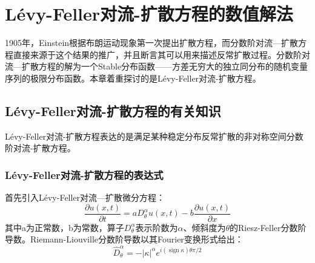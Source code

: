 
\chapter{Lévy-Feller对流-扩散方程的数值解法} \label{Chap:Surface_SCFT}

1905年，Einstein根据布朗运动现象第一次提出扩散方程，而分数阶对流—扩散方程直接来源于这个结果的推广，并且断言其可以用来描述反常扩散过程。分数阶对流—扩散方程的解为一个Stable分布函数——方差无穷大的独立同分布的随机变量序列的极限分布函数。本章着重探讨的是Lévy-Feller对流-扩散方程。

\section{Lévy-Feller对流-扩散方程的有关知识}
Lévy-Feller对流-扩散方程表达的是满足某种稳定分布反常扩散的非对称空间分数阶对流-扩散方程\cite{lqx2007}。

\subsection{Lévy-Feller对流-扩散方程的表达式}
首先引入Lévy-Feller对流—扩散微分方程：
\begin{equation} 
\frac{\partial u(x, t)}{\partial t}=a D_{\theta}^{\alpha} u(x, t)-b \frac{\partial u(x, t)}{\partial x}
\end{equation}
其中a为正常数，b为常数，算子$D^{\alpha}_{\theta}$表示阶数为$\alpha$、倾斜度为$\theta$的Riesz-Feller分数阶导数。Riemann-Liouville分数阶导数以其Fourier变换形式给出：
\begin{equation} 
\widehat{D}_{\theta}^{\alpha}=-|\kappa|^{\alpha} e^{i(\operatorname{sign} \kappa) \theta \pi / 2}
\end{equation}

